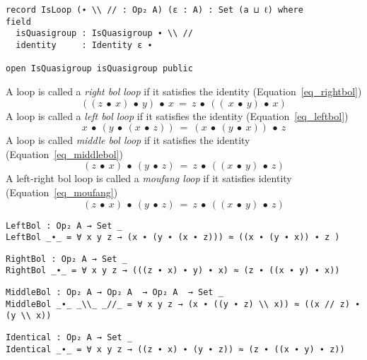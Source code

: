 \begin{verbatim}
record IsLoop (∙ \\ // : Op₂ A) (ε : A) : Set (a ⊔ ℓ) where
field
  isQuasigroup : IsQuasigroup ∙ \\ //
  identity     : Identity ε ∙

open IsQuasigroup isQuasigroup public
\end{verbatim}
A loop is called a \textit{right bol loop} if it satisfies the identity
(Equation~\ref{eq_rightbol})
\begin{equation}\label{eq_rightbol}
 ((z\ ∙\ x)\ ∙\ y)\ ∙\ x\ =\ z\ ∙\ ((\ x\ ∙\ y)\ ∙\ x)
\end{equation}
A loop is called a \textit{left bol loop} if it satisfies the identity
(Equation~\ref{eq_leftbol})
\begin{equation}\label{eq_leftbol}
 x\ ∙\ (y\ ∙\ (x\ ∙\ z))\ =\ (x\ ∙\ (y\ ∙\ x))\ ∙\ z
\end{equation}
A loop is called \textit{middle bol loop} if it satisfies the identity
(Equation~\ref{eq_middlebol}) 
\begin{equation}\label{eq_middlebol}
(z\ ∙\ x)\ ∙\ (y\ ∙\ z)\ =\ z\ ∙\ ((x\ ∙\ y)\ ∙\ z)
\end{equation}
A left-right bol loop is called a \textit{moufang loop} if it satisfies identity
(Equation~\ref{eq_moufang})
\begin{equation}\label{eq_moufang}
(z\ ∙\ x)\ ∙\ (y\ ∙\ z)\ =\ z\ ∙\ ((x\ ∙\ y)\ ∙\ z)
\end{equation} 

\begin{verbatim}
LeftBol : Op₂ A → Set _
LeftBol _∙_ = ∀ x y z → (x ∙ (y ∙ (x ∙ z))) ≈ ((x ∙ (y ∙ x)) ∙ z )
\end{verbatim}
\begin{verbatim}
RightBol : Op₂ A → Set _
RightBol _∙_ = ∀ x y z → (((z ∙ x) ∙ y) ∙ x) ≈ (z ∙ ((x ∙ y) ∙ x))
\end{verbatim}
\begin{verbatim}
MiddleBol : Op₂ A → Op₂ A  → Op₂ A  → Set _
MiddleBol _∙_ _\\_ _//_ = ∀ x y z → (x ∙ ((y ∙ z) \\ x)) ≈ ((x // z) ∙ (y \\ x))
\end{verbatim}
\begin{verbatim}
Identical : Op₂ A → Set _
Identical _∙_ = ∀ x y z → ((z ∙ x) ∙ (y ∙ z)) ≈ (z ∙ ((x ∙ y) ∙ z))
\end{verbatim}

